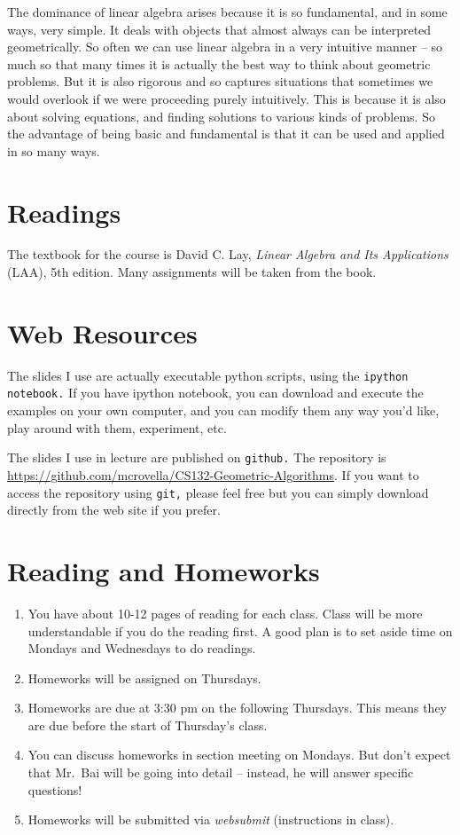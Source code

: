 \documentclass[11pt]{article}
\begin{document}
The dominance of linear algebra arises because it is so fundamental, and
in some ways, very simple. It deals with objects that almost always can
be interpreted geometrically. So often we can use linear algebra in a
very intuitive manner -- so much so that many times it is actually the
best way to think about geometric problems. But it is also rigorous and so
captures situations that sometimes we would overlook if we were
proceeding purely intuitively. This is because it is also about solving
equations, and finding solutions to various kinds of problems. So the
advantage of being basic and fundamental is that it can be used and
applied in so many ways. 

\section*{Readings} 

The textbook for the course is David C. Lay, \emph{Linear Algebra and
  Its Applications} (LAA), 5th edition.    Many assignments will be taken
from the book.

\section*{Web Resources} 

The slides I use are actually executable python scripts, using the
\texttt{ipython notebook.}   If you have ipython notebook, you can
download and execute the examples on your own computer, and you can
modify them any way you'd like, play around with them, experiment, etc.

The slides I use in lecture are published on \texttt{github.}   The
repository is
\url{https://github.com/mcrovella/CS132-Geometric-Algorithms}.  If you want
to access the repository using \texttt{git,} please feel free but you
can simply download directly from the web site if you prefer.
 
\section*{Reading and Homeworks}

\begin{enumerate}
\item  You have about 10-12 pages of reading for each class.   Class will be
more understandable if you do the reading first.   A good plan is to set aside
time on Mondays and Wednesdays to do readings.
\item  Homeworks will be assigned on Thursdays.
\item Homeworks are due at 3:30 pm on the following Thursdays.  This means they are due
before the start of Thursday's class.
\item You can discuss homeworks in section meeting on Mondays.   But don't
expect that Mr.\ Bai will be going into detail -- instead, he will
answer specific questions!
\item Homeworks will be submitted via \emph{websubmit} (instructions in class).
\end{enumerate}
\end{document}
